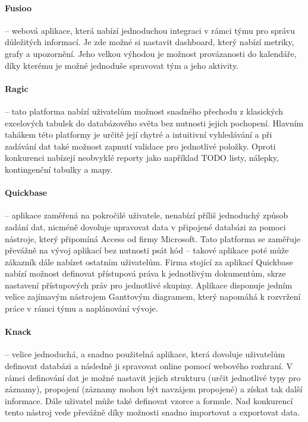 \paragraph{Fusioo} -- webová aplikace, která nabízí jednoduchou integraci v rámci týmu pro správu důležitých informací. Je zde možné si nastavit dashboard, který nabízí metriky, grafy a upozornění. Jeho velkou výhodou je možnost provázanosti do kalendáře, díky kterému je možné jednoduše spravovat tým a jeho aktivity.

\paragraph{Ragic} -- tato platforma nabízí uživatelům možnost snadného přechodu z klasických excelových tabulek do databázového světa bez nutnosti jejich pochopení. Hlavním tahákem této platformy je určitě její chytré a intuitivní vyhledávání a při zadávání dat také možnost zapnutí validace pro jednotlivé položky. Oproti konkurenci nabízejí neobvyklé reporty jako například TODO listy, nálepky, kontingenční tabulky a mapy.

\paragraph{Quickbase} -- aplikace zaměřená na pokročilé uživatele, nenabízí příliš jednoduchý způsob zadání dat, nicméně dovoluje upravovat data v připojené databázi za pomoci nástroje, který připomíná Access od firmy Microsoft. Tato platforma se zaměřuje převážně na vývoj aplikací bez nutnosti psát kód -- takové aplikace poté může zákazník dále nabízet ostatním uživatelům. Firma stojící za aplikací Quickbase nabízí možnost definovat přístupová práva k jednotlivým dokumentům, skrze nastavení přístupových práv pro jednotlivé skupiny. Aplikace disponuje jedním velice zajímavým nástrojem Ganttovým diagramem, který napomáhá k rozvržení práce v rámci týmu a naplánování vývoje.

\paragraph{Knack} -- velice jednoduchá, a snadno použitelná aplikace, která dovoluje uživatelům definovat databázi a následně ji spravovat online pomocí webového rozhraní. V rámci definování dat je možné nastavit jejich strukturu (určit jednotlivé typy pro záznamy), propojení (záznamy mohou být navzájem propojené) a získat tak další informace. Dále uživatel může také definovat vzorce a formule. Nad konkurencí tento nástroj vede převážně díky možnosti snadno importovat a exportovat data.

